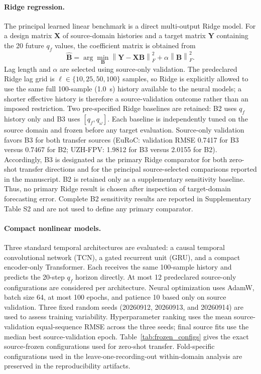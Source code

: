 \documentclass[preprint,12pt]{elsarticle}
\newcommand{\qf}{q_f}
\newcommand{\qw}{q_\omega}
\newcommand{\vect}[1]{\boldsymbol{#1}}
\begin{document}
\paragraph{Ridge regression.}
The principal learned linear benchmark is a direct multi-output Ridge model. For a design matrix $\vect{X}$ of source-domain histories and a target matrix $\vect{Y}$ containing the 20 future $\qf$ values, the coefficient matrix is obtained from
\begin{equation}
\widehat{\vect{B}}
=\arg\min_{\vect{B}}
\left\|\vect{Y}-\vect{X}\vect{B}\right\|_F^2
+\alpha\left\|\vect{B}\right\|_F^2.
\label{eq:ridge}
\end{equation}
Lag length and $\alpha$ are selected using source-only validation. The predeclared Ridge lag grid is $\ell\in\{10,25,50,100\}$ samples, so Ridge is explicitly allowed to use the same full 100-sample (\SI{1.0}{\second}) history available to the neural models; a shorter effective history is therefore a source-validation outcome rather than an imposed restriction. Two pre-specified Ridge baselines are retained: B2 uses $\qf$ history only and B3 uses $[\qf,\qw]$. Each baseline is independently tuned on the source domain and frozen before any target evaluation. Source-only validation favors B3 for both transfer sources (EuRoC: validation RMSE 0.7417 for B3 versus 0.7467 for B2; UZH-FPV: 1.9812 for B3 versus 2.0155 for B2). Accordingly, B3 is designated as the primary Ridge comparator for both zero-shot transfer directions and for the principal source-selected comparisons reported in the manuscript. B2 is retained only as a supplementary sensitivity baseline. Thus, no primary Ridge result is chosen after inspection of target-domain forecasting error. Complete B2 sensitivity results are reported in Supplementary Table S2 and are not used to define any primary comparator.

\paragraph{Compact nonlinear models.}
Three standard temporal architectures are evaluated: a causal temporal convolutional network (TCN), a gated recurrent unit (GRU), and a compact encoder-only Transformer. Each receives the same 100-sample history and predicts the 20-step $\qf$ horizon directly. At most 12 predeclared source-only configurations are considered per architecture. Neural optimization uses AdamW, batch size 64, at most 100 epochs, and patience 10 based only on source validation. Three fixed random seeds (20260912, 20260913, and 20260914) are used to assess training variability. Hyperparameter ranking uses the mean source-validation equal-sequence RMSE across the three seeds; final source fits use the median best source-validation epoch. Table~\ref{tab:frozen_configs} gives the exact source-frozen configurations used for zero-shot transfer. Fold-specific configurations used in the leave-one-recording-out within-domain analysis are preserved in the reproducibility artifacts.
\end{document}
